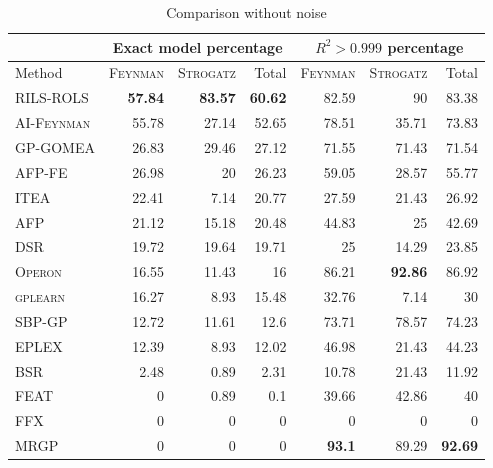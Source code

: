 \documentclass{bmcart}
\begin{document}
\begin{table}[!h]
	\caption{Comparison without noise}\label{tab:comp_noise0}
	\centering
	\begin{tabular}{l|rrr|rrr} \hline
		& \multicolumn{3}{c|}{Exact model percentage} & \multicolumn{3}{c}{$R^2 > 0.999$ percentage}\\ \hline
		Method &  \textsc{Feynman} & \textsc{Strogatz}& Total &  \textsc{Feynman} & \textsc{Strogatz} & Total \\ \hline
		\textsc{RILS-ROLS}&\bf{57.84}&\bf{83.57}&\bf{60.62}&82.59&90&83.38\\
		\textsc{AI-Feynman}&55.78&27.14&52.65&78.51&35.71&73.83\\
		\textsc{GP-GOMEA}&26.83&29.46&27.12&71.55&71.43&71.54\\
		\textsc{AFP-FE}&26.98&20&26.23&59.05&28.57&55.77\\
		\textsc{ITEA}&22.41&7.14&20.77&27.59&21.43&26.92\\
		\textsc{AFP}&21.12&15.18&20.48&44.83&25&42.69\\
		\textsc{DSR}&19.72&19.64&19.71&25&14.29&23.85\\
		\textsc{Operon}&16.55&11.43&16&86.21&\bf{92.86}&86.92\\
		\textsc{gplearn}&16.27&8.93&15.48&32.76&7.14&30\\
		\textsc{SBP-GP}&12.72&11.61&12.6&73.71&78.57&74.23\\
		\textsc{EPLEX}&12.39&8.93&12.02&46.98&21.43&44.23\\
		\textsc{BSR}&2.48&0.89&2.31&10.78&21.43&11.92\\
		\textsc{FEAT}&0&0.89&0.1&39.66&42.86&40\\
		\textsc{FFX}&0&0&0&0&0&0\\
		\textsc{MRGP}&0&0&0&\bf{93.1}&89.29&\bf{92.69}\\
		\hline
	\end{tabular}
\end{table}
\end{document}
